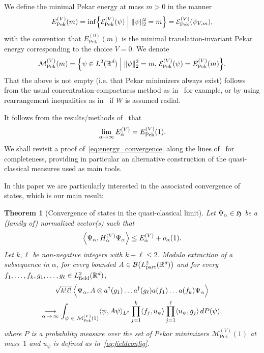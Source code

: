 \documentclass[10pt]{amsart}
\newtheorem{theo}{Theorem}[section]
\theoremstyle{definition}\newtheorem{defi}[theo]{Definition}\newtheorem{rema}[theo]{Remark}\newtheorem{exam}[theo]{Example}\newtheorem{exem}[theo]{Example}\newtheorem{nota}[theo]{Notation}
\DeclareMathOperator{\Pek}{Pek}
\DeclareMathOperator{\partt}{part}
\DeclareMathOperator{\field}{field}
\newcommand{\R}{\mathbb{R}}
\newcommand{\gH}{\mathfrak{H}}
\newcommand{\cB}{\mathcal{B}}
\newcommand{\cE}{\mathcal{E}}
\newcommand{\cM}{\mathcal{M}}
\newcommand{\1}{\mathds{1}}
\let\oldin\in
\renewcommand{\in}{\mathchoice{\oldin}{\oldin}{\,\oldin\,}{\,\oldin\,}}
\renewcommand*{\to}{\mathchoice{\longrightarrow}{\rightarrow}{\rightarrow}{\rightarrow}}
\let\originalleft\left
\let\originalright\right
\renewcommand{\left}{\mathopen{}\mathclose\bgroup\originalleft}
\renewcommand{\right}{\aftergroup\egroup\originalright}
\begin{document}
We define the minimal Pekar energy at mass $m >0$ in the manner
\begin{equation}\label{eq:pekar_energy}
E_{\Pek}^{(V)}(m)=\inf\left\{ \cE^{(V)}_{\Pek}(\psi)\;\middle|\;\|\psi\|_{2}^2=m \right\} = \cE_{\Pek}^{(V)}\left(\psi_{V,m} \right),
\end{equation}
with the convention that $E_{\Pek}^{(0)}(m)$ is the minimal translation-invariant Pekar energy corresponding to the choice $V=0$. We denote
\begin{equation}\label{eq:minimizers}
\cM _{\Pek}^{(V)}(m) = \left\{\psi\in L^2 (\R^d)\;\middle|\; \|\psi\|_{2}^2=m,\, \cE_{\Pek}^{(V)}\left(\psi \right) = E_{\Pek}^{(V)}(m) \right\}.
\end{equation}
That the above is not empty (i.e. that Pekar minimizers always exist) follows from the usual concentration-compactness method as in~\cite{FroJonLen-07b,LewRou-13b,Ricaud-14} for example, or by using rearrangement inequalities as in~\cite{Lieb-77} if $W$ is assumed radial.


It follows from the results/methods of~\cite{CorFalOli-20,DonVar-83,LieTho-97} that
\begin{equation}\label{eq:energy_convergence}
\lim_{\alpha\to\infty} E^{(V)}_\alpha =E^{(V)}_{\Pek}(1).
\end{equation}
We shall revisit a proof of~\eqref{eq:energy_convergence} along the lines of~\cite{CorFalOli-20} for completeness, providing in particular an alternative construction of the quasi-classical measures used as main tools.

In this paper we are particularly interested in the associated convergence of states, which is our main result:




\begin{theo}[{Convergence of states in the quasi-classical limit}]\label{thm:main}
Let $\Psi_\alpha \in \gH$ be a (family of) normalized vector(s) such that
\begin{equation}\label{eq:minimizing_sequence}
\left\langle \Psi_\alpha, H^{(V)}_\alpha\Psi_\alpha\right\rangle\le E^{(V)}_\alpha+o_\alpha(1).
\end{equation}
Let $k,\ell$ be non-negative integers with $k+\ell \leq 2$. Modulo extraction of a subsequence in $\alpha$, for every bounded $A\in \cB\big(L^2_{\partt}(\R^d) \big)$ and for every $f_1,\dots,f_k,g_1,\dots,g_\ell\in L^2_{\field}(\R^d)$,
\begin{multline}\label{eq:mainCV}
\sqrt{k!\ell!}\, \Big\langle \Psi_\alpha, A \otimes a^\dagger(g_1)\dots a^\dagger(g_\ell) a(f_1)\dots a(f_k) \Psi_\alpha \Big \rangle  \\
\underset{\alpha\,\to\,\infty}{\to}\int_{\psi \in \cM _{\Pek}^{(V)}(1)} \langle \psi, A \psi \rangle_{L^2} \prod_{j=1}^k\langle f_j,u_\psi \rangle \prod_{j=1}^\ell\langle u_\psi, g_j\rangle\,dP(\psi),
\end{multline}
where $P$ is a probability measure over the set of Pekar minimizers $\cM _{\Pek}^{(V)}(1)$ at mass~$1$ and $u_\psi$ is defined as in~\eqref{eq:fieldconfig}.
\end{theo}
\end{document}
